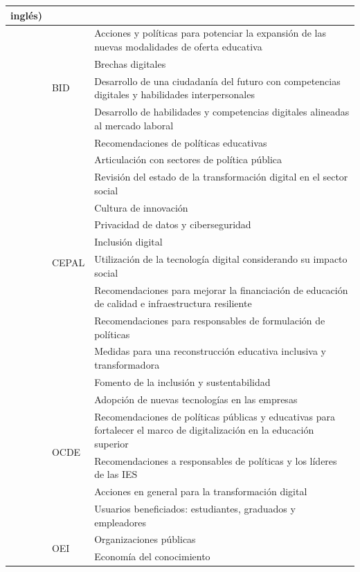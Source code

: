 \begin{longtable}{
>{\raggedright\arraybackslash}p{} l >{\raggedright\arraybackslash}p{}}
    inglés) \\
\midrule
    \multirow{27}{=}{Aspecto social} & \multirow{5}{*}{BID} &
    Acciones y políticas para potenciar la expansión de las nuevas
    modalidades de oferta educativa \\
    & & Brechas digitales \\
    & & Desarrollo de una ciudadanía del futuro con competencias digitales y
    habilidades interpersonales \\
    & & Desarrollo de habilidades y competencias digitales alineadas al
    mercado laboral \\
    & & Recomendaciones de políticas educativas \\
    & \multirow{9}{*}{CEPAL} & Articulación con sectores de política
    pública \\
    & & Revisión del estado de la transformación digital en el sector
    social \\
    & & Cultura de innovación \\
    & & Privacidad de datos y ciberseguridad \\
    & & Inclusión digital \\
    & & Utilización de la tecnología digital considerando su impacto
    social \\
    & & Recomendaciones para mejorar la financiación de educación de calidad
    e infraestructura resiliente \\
    & & Recomendaciones para responsables de formulación de políticas \\
    & & Medidas para una reconstrucción educativa inclusiva y
    transformadora \\
    & \multirow{6}{*}{OCDE} & Fomento de la inclusión y sustentabilidad \\
    & & Adopción de nuevas tecnologías en las empresas \\
    & & Recomendaciones de políticas públicas y educativas para fortalecer
    el marco de digitalización en la educación superior \\
    & & Recomendaciones a responsables de políticas y los líderes de las
    IES \\
    & & Acciones en general para la transformación digital \\
    & & Usuarios beneficiados: estudiantes, graduados y empleadores \\
    & \multirow{2}{*}{OEI} & Organizaciones públicas \\
    & & Economía del conocimiento \\

\end{longtable}
